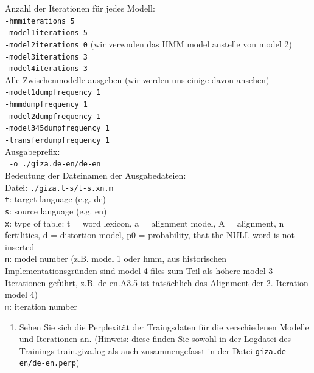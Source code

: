 \documentclass[12pt,fleqn]{article}
\begin{document}
\begin{enumerate}
Anzahl der Iterationen für jedes Modell:\\
\texttt{-hmmiterations 	5}\\
\texttt{-model1iterations  	5} \\
\texttt{-model2iterations	0} (wir verwnden das HMM model anstelle von model 2)\\
\texttt{-model3iterations	3}\\
\texttt{-model4iterations	3}\\


Alle Zwischenmodelle ausgeben (wir werden uns einige davon ansehen)\\
\texttt{-model1dumpfrequency 1}\\
\texttt{-hmmdumpfrequency 1}\\
\texttt{-model2dumpfrequency 1}\\
\texttt{-model345dumpfrequency 1}\\
\texttt{-transferdumpfrequency 1}\\


Ausgabeprefix:\\
\texttt{	-o ./giza.de-en/de-en} \\
Bedeutung der Dateinamen der Ausgabedateien:\\
Datei: \texttt{./giza.t-s/t-s.xn.m}\\


\texttt{t}: target language (e.g. de)\\
\texttt{s}: source language (e.g. en)\\


\texttt{x}: type of table: t = word lexicon, a = alignment model, A = alignment, n = fertilities, d = distortion model, p0 = probability, that the NULL word is not inserted\\
\texttt{n}: model number (z.B. model 1 oder hmm, aus historischen Implementationsgründen sind model 4 files zum Teil als höhere model 3 Iterationen geführt, z.B. de-en.A3.5 ist tatsächlich das Alignment der 2. Iteration model 4)\\
\texttt{m}: iteration number\\


\vspace{0.5cm} 
\begin{enumerate} 
\item Sehen Sie sich die Perplexität der Traingsdaten für die verschiedenen Modelle und Iterationen an. (Hinweis: diese finden Sie sowohl in der Logdatei des Trainings train.giza.log als auch zusammengefasst in der Datei \texttt{giza.de-en/de-en.perp})


\end{enumerate}
\end{enumerate}
\end{document}
